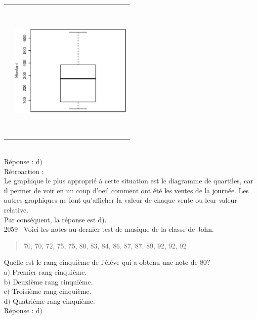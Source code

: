 \documentclass[letterpaper, 12pt]{article}
\begin{document}
\begin{tabular}{l l}
&
\includegraphics[width=6cm,height=7cm]{Q2058d.eps}\\

\end{tabular}\\

R\'eponse : d$)$\\

R\'etroaction :\\
Le graphique le plus appropri\'e \`a cette situation est le diagramme de quartiles, car il permet de voir en un coup d'oeil comment ont \'et\'e les ventes de la journ\'ee. Les autres graphiques ne font qu'afficher la valeur de chaque vente ou leur valeur relative.\\
Par cons\'equent, la r\'eponse est d).\\

2059-- Voici les notes au dernier test de musique de la classe de
John.
\begin{quote}
 70, 70, 72, 75, 75, 80, 83, 84, 86, 87, 87, 89, 92, 92, 92
\end{quote}
Quelle est le rang cinqui\`eme de l'\'el\`eve qui a obtenu une note de 80? \\

a$)$ Premier rang cinqui\`eme.\\
b$)$ Deuxi\`eme rang cinqui\`eme. \\
c$)$ Troisi\`eme rang cinqui\`eme.\\
d$)$ Quatri\`eme rang cinqui\`eme.\\

R\'eponse : d$)$\\
\end{document}
